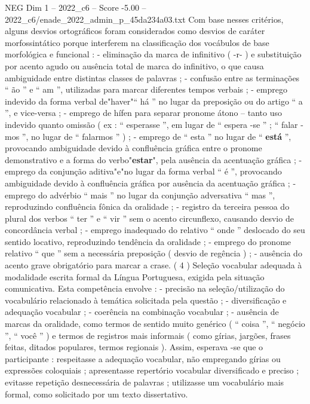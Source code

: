 \begin{textsample}{NEG Dim 1 – 2022\_c6 – Score -5.00 – 2022\_c6/enade\_2022\_admin\_p\_45da234a03.txt}
Com base nesses critérios, alguns desvios ortográficos foram considerados como desvios de caráter morfossintático porque interferem na classificação dos vocábulos de base morfológica e funcional : - eliminação da marca de infinitivo ( -r- ) e substituição por acento agudo ou ausência total de marca do infinitivo, o que causa ambiguidade entre distintas classes de palavras ; - confusão entre as terminações “ ão ” e “ am ”, utilizadas para marcar diferentes tempos verbais ; - emprego indevido da forma verbal de"haver"“ há ” no lugar da preposição ou do artigo “ a ”, e vice-versa ; - emprego de hífen para separar pronome átono – tanto uso indevido quanto omissão ( ex : “ esperasse ”, em lugar de “ espera -se ” ; “ falar -mos ”, no lugar de “ falarmos ” ) ; - emprego de “ esta ” no lugar de “ \textbf{está} ”, provocando ambiguidade devido à confluência gráfica entre o pronome demonstrativo e a forma do verbo"\textbf{estar}", pela ausência da acentuação gráfica ; - emprego da conjunção aditiva"e"no lugar da forma verbal “ é ”, provocando ambiguidade devido à confluência gráfica por ausência da acentuação gráfica ; - emprego do advérbio “ mais ” no lugar da conjunção adversativa “ mas ”, reproduzindo confluência fônica da oralidade ; - registro da terceira pessoa do plural dos verbos “ ter ” e “ vir ” sem o acento circunflexo, causando desvio de concordância verbal ; - emprego inadequado do relativo “ onde ” deslocado do seu sentido locativo, reproduzindo tendência da oralidade ; - emprego do pronome relativo “ que ” sem a necessária preposição ( desvio de regência ) ; - ausência do acento grave obrigatório para marcar a crase. ( 4 ) Seleção vocabular adequada à modalidade escrita formal da Língua Portuguesa, exigida pela situação comunicativa.
Esta competência envolve : - precisão na seleção/utilização do vocabulário relacionado à temática solicitada pela questão ; - diversificação e adequação vocabular ; - coerência na combinação vocabular ; - ausência de marcas da oralidade, como termos de sentido muito genérico ( “ coisa ”, “ negócio ”, “ você ” ) e termos de registros mais informais ( como gírias, jargões, frases feitas, ditados populares, termos regionais ).
Assim, esperava -se que o participante : respeitasse a adequação vocabular, não empregando gírias ou expressões coloquiais ; apresentasse repertório vocabular diversificado e preciso ; evitasse repetição desnecessária de palavras ; utilizasse um vocabulário mais formal, como solicitado por um texto dissertativo.

\end{textsample}
